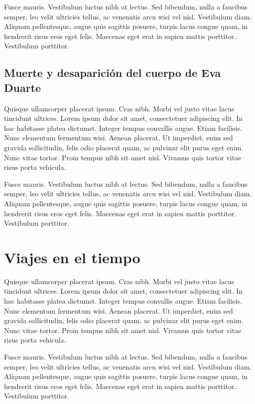 Fusce mauris. Vestibulum luctus nibh at lectus. Sed bibendum, nulla a faucibus semper, leo velit ultricies tellus, ac venenatis arcu wisi vel nisl. Vestibulum diam. Aliquam pellentesque, augue quis sagittis posuere, turpis lacus congue quam, in hendrerit risus eros eget felis. Maecenas eget erat in sapien mattis porttitor. Vestibulum porttitor.

\section{Muerte y desaparición del cuerpo de Eva Duarte}

Quisque ullamcorper placerat ipsum. Cras nibh. Morbi vel justo vitae lacus tincidunt ultrices. Lorem ipsum dolor sit amet, consectetuer adipiscing elit. In hac habitasse platea dictumst. Integer tempus convallis augue. Etiam facilisis. Nunc elementum fermentum wisi. Aenean placerat. Ut imperdiet, enim sed gravida sollicitudin, felis odio placerat quam, ac pulvinar elit purus eget enim. Nunc vitae tortor. Proin tempus nibh sit amet nisl. Vivamus quis tortor vitae risus porta vehicula.

Fusce mauris. Vestibulum luctus nibh at lectus. Sed bibendum, nulla a faucibus semper, leo velit ultricies tellus, ac venenatis arcu wisi vel nisl. Vestibulum diam. Aliquam pellentesque, augue quis sagittis posuere, turpis lacus congue quam, in hendrerit risus eros eget felis. Maecenas eget erat in sapien mattis porttitor. Vestibulum porttitor.

\chapter{Viajes en el tiempo}

Quisque ullamcorper placerat ipsum. Cras nibh. Morbi vel justo vitae lacus tincidunt ultrices. Lorem ipsum dolor sit amet, consectetuer adipiscing elit. In hac habitasse platea dictumst. Integer tempus convallis augue. Etiam facilisis. Nunc elementum fermentum wisi. Aenean placerat. Ut imperdiet, enim sed gravida sollicitudin, felis odio placerat quam, ac pulvinar elit purus eget enim. Nunc vitae tortor. Proin tempus nibh sit amet nisl. Vivamus quis tortor vitae risus porta vehicula.

Fusce mauris. Vestibulum luctus nibh at lectus. Sed bibendum, nulla a faucibus semper, leo velit ultricies tellus, ac venenatis arcu wisi vel nisl. Vestibulum diam. Aliquam pellentesque, augue quis sagittis posuere, turpis lacus congue quam, in hendrerit risus eros eget felis. Maecenas eget erat in sapien mattis porttitor. Vestibulum porttitor.

